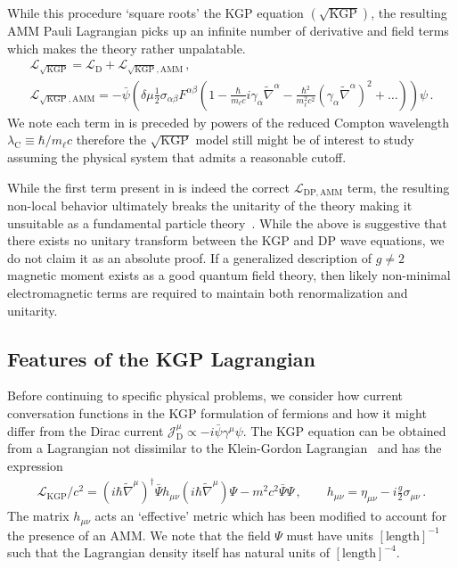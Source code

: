 While this procedure `square roots' the KGP equation $(\mathrm{\sqrt{KGP}})$, the resulting AMM Pauli Lagrangian  picks up an infinite number of derivative and field terms which makes the theory rather unpalatable.
\begin{gather}
    \label{lamm:2}
    \mathcal{L}_{\sqrt{\mathrm{KGP}}} = \mathcal{L}_\mathrm{D}+\mathcal{L}_\mathrm{\sqrt{KGP},AMM}\,,\\
    \label{lamm:3}
    \mathcal{L}_\mathrm{\sqrt{KGP},AMM} = -{\bar\psi}\left(\delta\mu\frac{1}{2}\sigma_{\alpha\beta}F^{\alpha\beta}\left(1 - \frac{\hbar}{m_{\ell}c}i\gamma_{\alpha}\widetilde\nabla^{\alpha} - \frac{\hbar^{2}}{m_{\ell}^{2}c^{2}}\left(\gamma_{\alpha}\widetilde\nabla^{\alpha}\right)^{2} + \ldots\right)\right)\psi\,.
\end{gather}
We note each term in  is preceded by powers of the reduced Compton wavelength $\lambda_\mathrm{C}\!\equiv\!\hbar/m_{\ell}c$ therefore the $\sqrt{\mathrm{KGP}}$ model still might be of interest to study assuming the physical system that admits a reasonable cutoff.

While the first term present in  is indeed the correct $\mathcal{L}_\mathrm{DP,AMM}$ term, the resulting non-local behavior ultimately breaks the unitarity of the theory making it unsuitable as a fundamental particle theory~\citep{Veltman:1997am}. While the above is suggestive that there exists no unitary transform between the KGP and DP wave equations, we do not claim it as an absolute proof. If a generalized description of $g\!\neq\!2$ magnetic moment exists as a good quantum field theory, then likely non-minimal electromagnetic terms are required to maintain both renormalization and unitarity.

\subsection{Features of the KGP Lagrangian}
\label{sec:lagrangian}
\noindent Before continuing to specific physical problems, we consider how current conversation functions in the KGP formulation of fermions and how it might differ from the Dirac current $\mathcal{J}_\mathrm{D}^{\mu}\propto-i\bar\psi\gamma^{\mu}\psi$. The KGP equation can be obtained from a Lagrangian not dissimilar to the Klein-Gordon Lagrangian~\citep{Delgado-Acosta:2010ita,DelgadoAcosta:2015ikk,Espin:2015bja} and has the expression
\begin{gather}
\label{lagrangian:1} \mathcal{L}_\mathrm{KGP}/c^{2}=\left(i\hbar{\widetilde\nabla}^{\mu}\right)^{\dag}\bar{\Psi}h_{\mu\nu}\left(i\hbar{\widetilde\nabla}^{\mu}\right)\Psi-m^{2}c^{2}\bar{\Psi}\Psi\,,\qquad h_{\mu\nu}=\eta_{\mu\nu}-i\frac{g}{2}\sigma_{\mu\nu}\,.
\end{gather}
The matrix $h_{\mu\nu}$ acts an `effective' metric which has been modified to account for the presence of an AMM. We note that the field $\Psi$ must have units $[\mathrm{length}]^{-1}$ such that the Lagrangian density itself has natural units of $[\mathrm{length}]^{-4}$.


